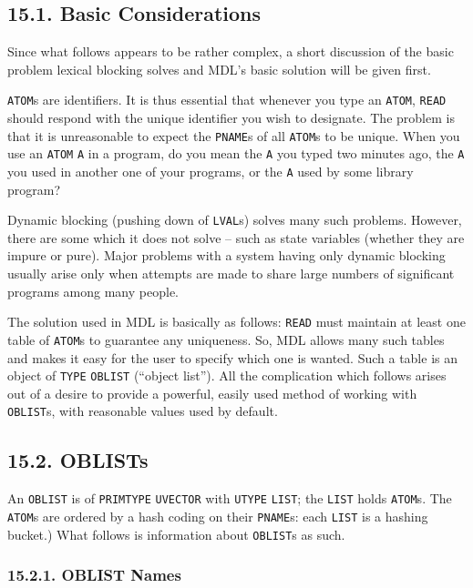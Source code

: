 \documentclass[a4paper,]{article}
\begin{document}
\subsection{15.1. Basic Considerations}\label{basic-considerations}

Since what follows appears to be rather complex, a short discussion of the basic problem lexical blocking solves and MDL's
basic solution will be given first.

\texttt{ATOM}s are identifiers. It is thus essential that whenever you type an \texttt{ATOM}, \texttt{READ} should respond
with the unique identifier you wish to designate. The problem is that it is unreasonable to expect the \texttt{PNAME}s of
all \texttt{ATOM}s to be unique. When you use an \texttt{ATOM} \texttt{A} in a program, do you mean the \texttt{A} you
typed two minutes ago, the \texttt{A} you used in another one of your programs, or the \texttt{A} used by some library
program?

Dynamic blocking (pushing down of \texttt{LVAL}s) solves many such problems. However, there are some which it does not
solve -- such as state variables (whether they are impure or pure). Major problems with a system having only dynamic
blocking usually arise only when attempts are made to share large numbers of significant programs among many people.

The solution used in MDL is basically as follows: \texttt{READ} must maintain at least one table of \texttt{ATOM}s to
guarantee any uniqueness. So, MDL allows many such tables and makes it easy for the user to specify which one is wanted.
Such a table is an object of \texttt{TYPE} \texttt{OBLIST} (``object list''). All the complication which follows arises out
of a desire to provide a powerful, easily used method of working with \texttt{OBLIST}s, with reasonable values used by
default.

\subsection{15.2. OBLISTs}\label{oblists}

An \texttt{OBLIST} is of \texttt{PRIMTYPE} \texttt{UVECTOR} with \texttt{UTYPE} \texttt{LIST}; the \texttt{LIST} holds
\texttt{ATOM}s. The \texttt{ATOM}s are ordered by a hash coding on their \texttt{PNAME}s: each \texttt{LIST} is a hashing
bucket.) What follows is information about \texttt{OBLIST}s as such.

\subsubsection{15.2.1. OBLIST Names}\label{oblist-names}
\end{document}
